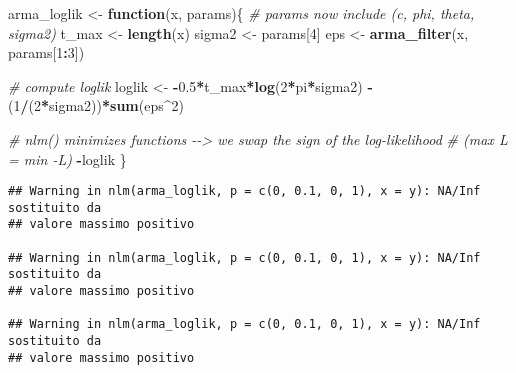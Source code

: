 \documentclass[
]{book}
\newenvironment{Shaded}{\begin{snugshade}}{\end{snugshade}}
\newcommand{\AttributeTok}[1]{\textcolor[rgb]{0.13,0.29,0.53}{#1}}
\newcommand{\CommentTok}[1]{\textcolor[rgb]{0.56,0.35,0.01}{\textit{#1}}}
\newcommand{\ControlFlowTok}[1]{\textcolor[rgb]{0.13,0.29,0.53}{\textbf{#1}}}
\newcommand{\DecValTok}[1]{\textcolor[rgb]{0.00,0.00,0.81}{#1}}
\newcommand{\DocumentationTok}[1]{\textcolor[rgb]{0.56,0.35,0.01}{\textbf{\textit{#1}}}}
\newcommand{\FloatTok}[1]{\textcolor[rgb]{0.00,0.00,0.81}{#1}}
\newcommand{\FunctionTok}[1]{\textcolor[rgb]{0.13,0.29,0.53}{\textbf{#1}}}
\newcommand{\NormalTok}[1]{#1}
\newcommand{\OtherTok}[1]{\textcolor[rgb]{0.56,0.35,0.01}{#1}}
\newcommand{\SpecialCharTok}[1]{\textcolor[rgb]{0.81,0.36,0.00}{\textbf{#1}}}
\begin{document}
\begin{Shaded}
\begin{Highlighting}[]
\NormalTok{arma\_loglik }\OtherTok{\textless{}{-}} \ControlFlowTok{function}\NormalTok{(x, params)\{}
  \CommentTok{\# params now include (c, phi, theta, sigma2)}
\NormalTok{  t\_max }\OtherTok{\textless{}{-}} \FunctionTok{length}\NormalTok{(x)}
\NormalTok{  sigma2 }\OtherTok{\textless{}{-}}\NormalTok{ params[}\DecValTok{4}\NormalTok{]}
\NormalTok{  eps }\OtherTok{\textless{}{-}} \FunctionTok{arma\_filter}\NormalTok{(x, params[}\DecValTok{1}\SpecialCharTok{:}\DecValTok{3}\NormalTok{])}

  \CommentTok{\# compute loglik}
\NormalTok{  loglik }\OtherTok{\textless{}{-}} \SpecialCharTok{{-}}\FloatTok{0.5}\SpecialCharTok{*}\NormalTok{t\_max}\SpecialCharTok{*}\FunctionTok{log}\NormalTok{(}\DecValTok{2}\SpecialCharTok{*}\NormalTok{pi}\SpecialCharTok{*}\NormalTok{sigma2) }\SpecialCharTok{{-}}\NormalTok{ (}\DecValTok{1}\SpecialCharTok{/}\NormalTok{(}\DecValTok{2}\SpecialCharTok{*}\NormalTok{sigma2))}\SpecialCharTok{*}\FunctionTok{sum}\NormalTok{(eps}\SpecialCharTok{\^{}}\DecValTok{2}\NormalTok{)}
  
  \CommentTok{\# nlm() minimizes functions {-}{-}\textgreater{} we swap the sign of the log{-}likelihood}
  \CommentTok{\# (max L = min {-}L)}
  \SpecialCharTok{{-}}\NormalTok{loglik}
\NormalTok{\}}
\end{Highlighting}
\end{Shaded}

\begin{Shaded}
\end{Shaded}

\begin{verbatim}
## Warning in nlm(arma_loglik, p = c(0, 0.1, 0, 1), x = y): NA/Inf sostituito da
## valore massimo positivo

## Warning in nlm(arma_loglik, p = c(0, 0.1, 0, 1), x = y): NA/Inf sostituito da
## valore massimo positivo

## Warning in nlm(arma_loglik, p = c(0, 0.1, 0, 1), x = y): NA/Inf sostituito da
## valore massimo positivo
\end{verbatim}
\end{document}
